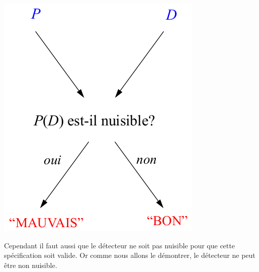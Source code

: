 \begin{center}
	\includegraphics[scale=0.45]{Images/effet_detecteur.png}
\end{center}

Cependant il faut aussi que le détecteur ne soit pas nuisible pour que cette spécification soit valide. Or comme nous allons le démontrer, le détecteur ne peut être non nuisible.

